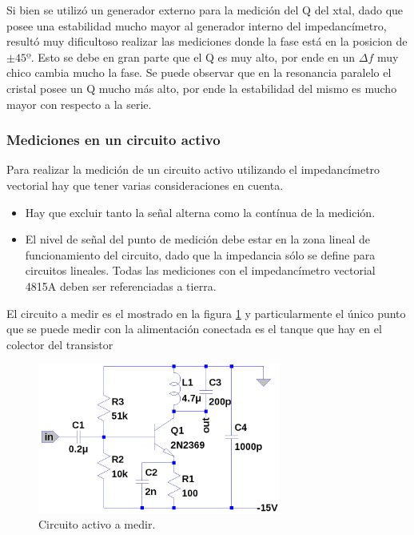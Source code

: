 \documentclass[a4paper,10pt]{article}
\begin{document}
		\indent Si bien se utilizó un generador externo para la medición del Q 
		del xtal, dado que posee una estabilidad mucho mayor al generador 
		interno del impedancímetro, resultó muy dificultoso realizar las 
		mediciones donde la fase está en la posicion de $\pm45º$. Esto se debe 
		en gran parte que el Q es muy alto, por ende en un $\Delta f$ muy chico 
		cambia mucho la fase. Se puede observar que en la resonancia paralelo el
		cristal posee un Q mucho más alto, por ende la estabilidad del mismo es 
		mucho mayor con respecto a la serie.

		\subsubsection{Mediciones en un circuito activo}
		
		\indent Para realizar la medición de un circuito activo utilizando el 
		impedancímetro vectorial hay que tener varias consideraciones en cuenta.
		
		\begin{itemize}
			\item Hay que excluir tanto la señal alterna como la contínua de la 
			medición.
			\item El nivel de señal del punto de medición debe estar en la zona 
			lineal de funcionamiento del circuito, dado que la impedancia sólo 
			se define para circuitos lineales.
			\indent Todas las mediciones con el impedancímetro vectorial 4815A 
			deben ser referenciadas a tierra.
		\end{itemize}
		
		\indent El circuito a medir es el mostrado en la figura \ref{img006} y 
		particularmente el único punto que se puede medir con la alimentación 
		conectada es el tanque que hay en el colector del transistor

		\begin{figure}[!htb]
			\centering
			\includegraphics[width=8cm]{Imagenes/ActiveCircuit.png}
			\caption{Circuito activo a medir.}
			\label{img006} 
		\end{figure}
\end{document}

